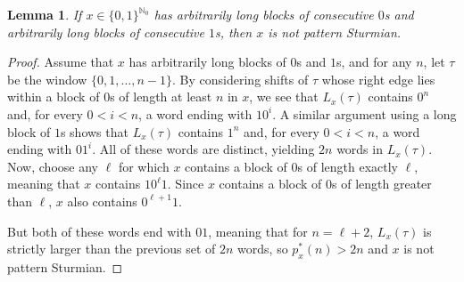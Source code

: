 \documentclass[11pt,reqno]{amsart}
\newtheorem{lemma}[theorem]{Lemma}
\theoremstyle{definition}
\theoremstyle{plain}
\newcommand{\N}{\mathbb{N}}
\begin{document}
\begin{lemma}\label{lem:long_0_and_1_not_pattern_Sturmian}
If $x \in \{0, 1\}^{\N_0}$ has arbitrarily long blocks of consecutive $0$s and arbitrarily long blocks of consecutive $1$s, then $x$ is not pattern Sturmian. 
\end{lemma}
\begin{proof}
Assume that $x$ has arbitrarily long blocks of $0$s and $1$s, and for any $n$, let $\tau$ be the window 
$\{0, 1, \ldots, n-1\}$. By considering shifts of $\tau$ whose right edge lies within a block of $0$s of length at least $n$ in $x$, we see that $L_x(\tau)$ contains $0^n$ and, for every $0 < i < n$, a word ending with $10^i$. A similar argument using a long block of $1$s shows that $L_x(\tau)$ contains $1^n$ and, for every $0 < i < n$, a word ending with $01^i$. All of these words are distinct, yielding $2n$ words in $L_x(\tau)$. Now, choose any $\ell$ for which $x$ contains a block of $0$s of length exactly $\ell$, meaning that $x$ contains $10^\ell 1$. Since $x$ contains a block of $0$s of length greater than $\ell$, $x$ also contains $0^{\ell + 1} 1$. 

But both of these words end with $01$, meaning that for $n = \ell + 2$, $L_x(\tau)$ is strictly larger than the previous set of $2n$ words, so $p^*_x(n) > 2n$ and $x$ is not pattern Sturmian.


\end{proof}
\end{document}
